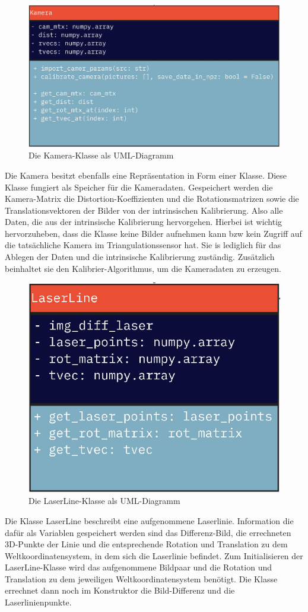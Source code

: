 		\begin{figure}[h]
			\centering
			\includegraphics[width=0.7\linewidth]{img/hauptteil/software/Kamera_UML.png}
			\caption{Die Kamera-Klasse als UML-Diagramm}
			\label{fig:kamera_uml}
		\end{figure}
		Die Kamera besitzt ebenfalls eine Repräsentation in Form einer Klasse. Diese Klasse fungiert als Speicher für die Kameradaten. Gespeichert werden die Kamera-Matrix die Distortion-Koeffizienten und die Rotationsmatrizen sowie die Translationsvektoren der Bilder von der intrinsischen Kalibrierung. Also alle Daten, die aus der intrinsische Kalibrierung hervorgehen. Hierbei ist wichtig hervorzuheben, dass die Klasse keine Bilder aufnehmen kann bzw kein Zugriff auf die tatsächliche Kamera im Triangulationssensor hat. Sie is lediglich für das Ablegen der Daten und die intrinsische Kalibrierung zuständig. Zusätzlich beinhaltet sie den Kalibrier-Algorithmus, um die Kameradaten zu erzeugen. 
		\newpage
		\begin{figure}[h]
			\centering
			\includegraphics[width=0.35\linewidth]{img/hauptteil/software/LaserLine_UML.png}
			\caption{Die LaserLine-Klasse als UML-Diagramm}
			\label{fig:laser_line_uml}
		\end{figure}
		Die Klasse LaserLine beschreibt eine aufgenommene Laserlinie. Information die dafür als Variablen gespeichert werden sind das Differenz-Bild, die errechneten 3D-Punkte der Linie und die entsprechende Rotation und Translation zu dem Weltkoordinatensystem, in dem sich die Laserlinie befindet. Zum Initialisieren der LaserLine-Klasse wird das aufgenommene Bildpaar und die Rotation und Translation zu dem jeweiligen Weltkoordinatensystem benötigt. Die Klasse errechnet dann noch im Konstruktor die Bild-Differenz und die Laserlinienpunkte.\nocite{*}
		
